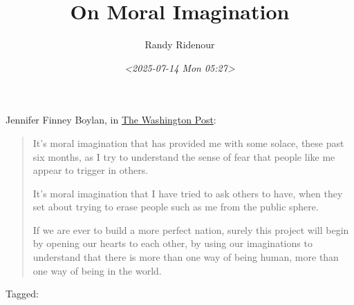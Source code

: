 \documentclass[11pt]{article}
\author{Randy Ridenour}
\date{\textit{<2025-07-14 Mon 05:27>}}
\title{On Moral Imagination}
\begin{document}
\maketitle
Jennifer Finney Boylan, in \href{https://www.washingtonpost.com/opinions/2025/07/13/superman-fd-christopher-reeve-father-jor-el/?carta-url=https\%3A\%2F\%2Fs2.washingtonpost.com\%2Fcar-ln-tr\%2F439ab12\%2F6874d524d2a65e78271600dc\%2F596a35569bbc0f0e09e8239c\%2F29\%2F64\%2F6874d524d2a65e78271600dc}{The Washington Post}:

\begin{quote}
It’s moral imagination that has provided me with some solace, these past six months, as I try to understand the sense of fear that people like me appear to trigger in others.

It’s moral imagination that I have tried to ask others to have, when they set about trying to erase people such as me from the public sphere.

If we are ever to build a more perfect nation, surely this project will begin by opening our hearts to each other, by using our imaginations to understand that there is more than one way of being human, more than one way of being in the world.
\end{quote}

\begin{tagline}
Tagged: 
\end{tagline}
\end{document}
